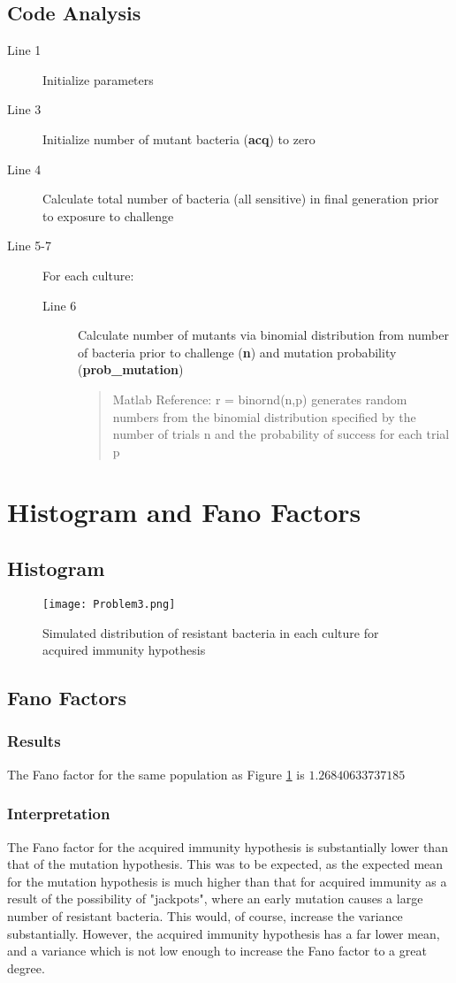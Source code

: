 \documentclass[titlepage]{scrreprt}
\begin{document}
\subsection{Code Analysis}
\begin{description}
    \item[Line 1] Initialize parameters
    \item[Line 3] Initialize number of mutant bacteria (\textbf{acq}) to zero
    \item[Line 4] Calculate total number of bacteria (all sensitive) in final generation prior to exposure to challenge
    \item[Line 5-7] For each culture:
    \begin{description}
        \item[Line 6] Calculate number of mutants via binomial distribution from number of bacteria prior to challenge (\textbf{n}) and mutation probability (\textbf{prob\_mutation})
        \begin{quote}
            Matlab Reference: r = binornd(n,p) generates random numbers from the binomial distribution specified by the number of trials n and the probability of success for each trial p
        \end{quote}
    \end{description}
\end{description}
\section{Histogram and Fano Factors}
\subsection{Histogram}
\begin{figure}[H]
    \centering
    \texttt{[image: Problem3.png]}
    \caption{Simulated distribution of resistant bacteria in each culture for acquired immunity hypothesis}
    \label{fig:problem3_histogram}
\end{figure}
\subsection{Fano Factors}
\subsubsection{Results}
The Fano factor for the same population as Figure \ref{fig:problem3_histogram} is $1.26840633737185$
\subsubsection{Interpretation}
The Fano factor for the acquired immunity hypothesis is substantially lower than that of the mutation hypothesis.  This was to be expected, as the expected mean for the mutation hypothesis is much higher than that for acquired immunity as a result of the possibility of "jackpots", where an early mutation causes a large number of resistant bacteria.  This would, of course, increase the variance substantially.  However, the acquired immunity hypothesis has a far lower mean, and a variance which is not low enough to increase the Fano factor to a great degree.
\end{document}
